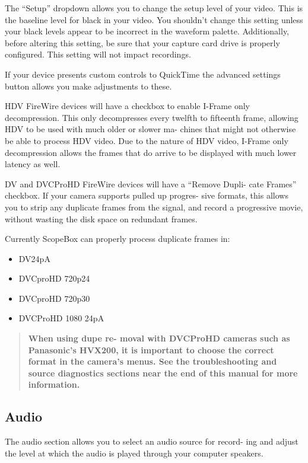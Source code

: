 \documentclass[10,letterpaper,]{report}
\begin{document}
The ``Setup'' dropdown allows you to change the setup level of your
video. This is the baseline level for black in your video. You shouldn't
change this setting unless your black levels appear to be incorrect in
the waveform palette. Additionally, before altering this setting, be
sure that your capture card drive is properly configured. This setting
will not impact recordings.

If your device presents custom controls to QuickTime the advanced
settings button allows you make adjustments to these.

HDV FireWire devices will have a checkbox to enable I-Frame only
decompression. This only decompresses every twelfth to fifteenth frame,
allowing HDV to be used with much older or slower ma- chines that might
not otherwise be able to process HDV video. Due to the nature of HDV
video, I-Frame only decompression allows the frames that do arrive to be
displayed with much lower latency as well.

DV and DVCProHD FireWire devices will have a ``Remove Dupli- cate
Frames'' checkbox. If your camera supports pulled up progres- sive
formats, this allows you to strip any duplicate frames from the signal,
and record a progressive movie, without wasting the disk space on
redundant frames.

Currently ScopeBox can properly process duplicate frames in:

\begin{itemize}
\itemsep1pt\parskip0pt
\item
  DV24pA
\item
  DVCproHD 720p24
\item
  DVCproHD 720p30
\item
  DVCProHD 1080 24pA
\end{itemize}

\begin{quote}
\textbf{When using dupe re- moval with DVCProHD cameras such as
Panasonic's HVX200, it is important to choose the correct format in the
camera's menus. See the troubleshooting and source diagnostics sections
near the end of this manual for more information.}
\end{quote}

\subsection{Audio}

The audio section allows you to select an audio source for record- ing
and adjust the level at which the audio is played through your computer
speakers.
\end{document}
